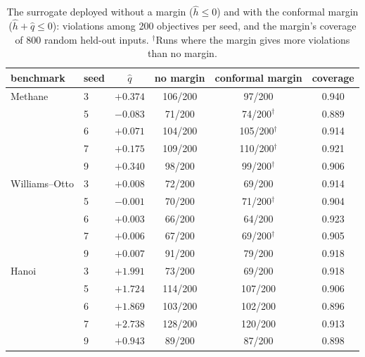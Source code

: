 \begin{table}[t]
\centering
\small
\caption{The surrogate deployed without a margin ($\hat h\le 0$) and with the
conformal margin ($\hat h+\hat q\le 0$): violations among 200 objectives per seed,
and the margin's coverage of 800 random held-out inputs. $^{\dagger}$Runs where the
margin gives more violations than no margin.}
\label{tab:nomargin}
\begin{tabular}{llcccc}
\toprule
benchmark & seed & $\hat q$ & no margin & conformal margin & coverage \\
\midrule
Methane & 3 & $+0.374$ & 106/200 & 97/200 & 0.940 \\
 & 5 & $-0.083$ & 71/200 & 74/200$^{\dagger}$ & 0.889 \\
 & 6 & $+0.071$ & 104/200 & 105/200$^{\dagger}$ & 0.914 \\
 & 7 & $+0.175$ & 109/200 & 110/200$^{\dagger}$ & 0.921 \\
 & 9 & $+0.340$ & 98/200 & 99/200$^{\dagger}$ & 0.906 \\
\addlinespace[2pt]
Williams--Otto & 3 & $+0.008$ & 72/200 & 69/200 & 0.914 \\
 & 5 & $-0.001$ & 70/200 & 71/200$^{\dagger}$ & 0.904 \\
 & 6 & $+0.003$ & 66/200 & 64/200 & 0.923 \\
 & 7 & $+0.006$ & 67/200 & 69/200$^{\dagger}$ & 0.905 \\
 & 9 & $+0.007$ & 91/200 & 79/200 & 0.918 \\
\addlinespace[2pt]
Hanoi & 3 & $+1.991$ & 73/200 & 69/200 & 0.918 \\
 & 5 & $+1.724$ & 114/200 & 107/200 & 0.906 \\
 & 6 & $+1.869$ & 103/200 & 102/200 & 0.896 \\
 & 7 & $+2.738$ & 128/200 & 120/200 & 0.913 \\
 & 9 & $+0.943$ & 89/200 & 87/200 & 0.898 \\
\bottomrule
\end{tabular}
\end{table}
